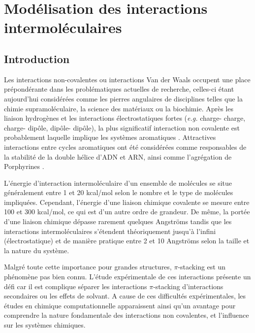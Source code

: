 \chapter[Modélisation des interactions intermoléculaires]{Modélisation des interactions intermoléculaires}
\minitoc
\restoregeometry

\newpage

\section*{Introduction}

Les interactions non-covalentes ou interactions Van der Waals occupent une place prépondérante dans les problématiques actuelles de recherche, celles-ci étant aujourd'hui considérées comme les pierres angulaires de disciplines telles que la chimie supramoléculaire, la science des matériaux ou la biochimie.  Après les liaison hydrogènes et les interactions électrostatiques fortes (\textit{e.g.} charge- charge, charge- dipôle, dipôle- dipôle), la plus significatif interaction non covalente est probablement laquelle implique les systèmes aromatiques \cite{grimme2008special}. Attractives interactions entre cycles aromatiques ont été considérées comme  responsables de la stabilité de la double hélice d'ADN et ARN, ainsi comme l'agrégation de Porphyrines \cite{mcgaughey1998pi}.

L'énergie d'interaction intermoléculaire d'un ensemble de molécules se situe généralement entre 1 et 20 kcal/mol selon le nombre et le type de molécules impliquées. Cependant, l'énergie d'une liaison chimique covalente se mesure entre 100 et 300 kcal/mol, ce qui est d’un autre ordre de grandeur. De même, la portée d’une liaison chimique dépasse rarement quelques Angströms tandis que les interactions intermoléculaires s'étendent théoriquement jusqu'à l'infini (électrostatique) et de manière pratique entre 2 et 10 Angströms selon la taille et la nature du système.

Malgré toute cette importance pour grandes structures, $\pi$-stacking est un phénomène pas bien connu. L’étude expérimentale de ces interactions présente un défi car il est complique séparer les interactions $\pi$-stacking d’interactions secondaires ou les effets de solvant. A cause de ces difficultés expérimentales, les études en chimique computationnelle apparaissent ainsi qu’un avantage pour comprendre la nature fondamentale des interactions non covalentes, et l’influence sur les systèmes chimiques. 

